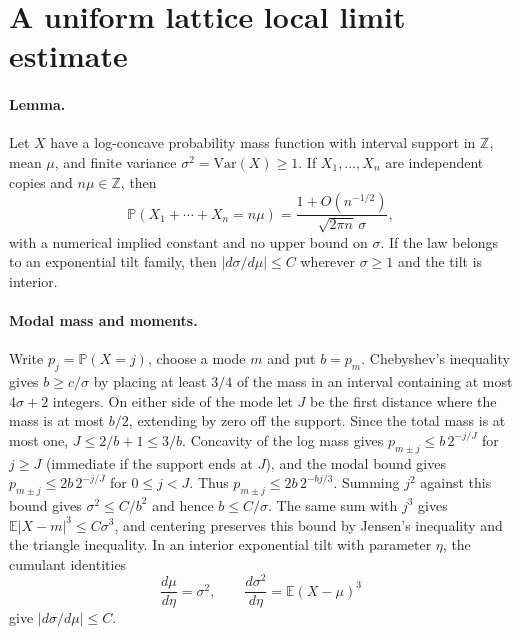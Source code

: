 \section{A uniform lattice local limit estimate}
\label{app:lattice-llt}

\paragraph{Lemma.}
Let $X$ have a log-concave probability mass function with interval
support in $\mathbb Z$, mean $\mu$, and finite variance $\sigma^2=\mathrm{Var}(X)\ge1$.
If $X_1,\ldots,X_n$ are independent copies and $n\mu\in\mathbb Z$, then
\[
\mathbb P(X_1+\cdots+X_n=n\mu)
=\frac{1+O(n^{-1/2})}{\sqrt{2\pi n}\,\sigma},
\]
with a numerical implied constant and no upper bound on $\sigma$.
If the law belongs to an exponential tilt family, then
$|d\sigma/d\mu|\le C$ wherever $\sigma\ge1$ and the tilt is interior.

\paragraph{Modal mass and moments.}
Write $p_j=\mathbb P(X=j)$, choose a mode $m$ and put $b=p_m$.
Chebyshev's inequality gives $b\ge c/\sigma$ by placing at least
$3/4$ of the mass in an interval containing at most $4\sigma+2$
integers. On either side of the mode let $J$ be the first distance
where the mass is at most $b/2$, extending by zero off the support.
Since the total mass is at most one, $J\le 2/b+1\le3/b$.
Concavity of the log mass gives $p_{m\pm j}\le b\,2^{-j/J}$ for
$j\ge J$ (immediate if the support ends at $J$), and the modal bound gives $p_{m\pm j}\le2b\,2^{-j/J}$
for $0\le j<J$. Thus $p_{m\pm j}\le2b\,2^{-bj/3}$. Summing $j^2$
against this bound gives $\sigma^2\le C/b^2$ and hence $b\le C/\sigma$.
The same sum with $j^3$ gives $\mathbb E|X-m|^3\le C\sigma^3$,
and centering preserves this bound by Jensen's inequality and the
triangle inequality. In an interior exponential tilt with parameter
$\eta$, the cumulant identities
\[
\frac{d\mu}{d\eta}=\sigma^2,\qquad
\frac{d\sigma^2}{d\eta}=\mathbb E(X-\mu)^3
\]
give $|d\sigma/d\mu|\le C$.

